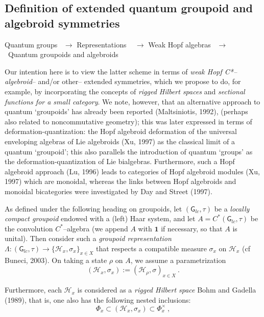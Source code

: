 \documentclass[12pt]{article}
\theoremstyle{plain}
\theoremstyle{definition}
\numberwithin{equation}{section}
\newcommand{\grp}{{\mathsf{G}}}
\newcommand{\lra}{{\longrightarrow}}
\newcommand{\<}{{\langle}}
\begin{document}
\subsection{Definition of extended quantum groupoid and algebroid symmetries}

 Quantum groups~ $\rightarrow$ Representations ~ $\rightarrow$ Weak Hopf algebras ~$\rightarrow$ ~Quantum groupoids and algebroids

   Our intention here is to view the latter scheme in terms of
\emph{weak Hopf C*--algebroid}-- and/or other-- extended
symmetries, which we propose to do, for example, by incorporating
the concepts of \emph{rigged Hilbert spaces} and \emph{sectional
functions for a small category}. We note, however, that an
alternative approach to quantum `groupoids' has already been
reported (Maltsiniotis, 1992), (perhaps also related to
noncommutative geometry); this was later expressed in terms of
deformation-quantization:  the Hopf algebroid deformation of the
universal enveloping algebras of Lie algebroids (Xu, 1997) as the
classical limit of a quantum `groupoid'; this also parallels the
introduction of quantum `groups' as the deformation-quantization
of Lie bialgebras. Furthermore, such a Hopf algebroid approach
(Lu, 1996) leads to categories of Hopf algebroid modules (Xu,
1997) which are monoidal, whereas the links between Hopf
algebroids and monoidal bicategories were investigated by Day and
Street (1997).

As defined under the following heading on groupoids, let 
$(\grp_{lc},\tau)$ be a \emph{locally compact groupoid} endowed with a (left) Haar system,
and let $A= C^*(\grp_{lc},\tau)$ be the convolution
$C^*$--algebra (we append $A$ with $\mathbf 1$ if necessary, so
that $A$ is unital). Then consider such a \textit{groupoid
representation} \\ $\Lambda :(\grp_{lc}, \tau) \lra \{\mathcal
H_x, \sigma_x \}_{x \in X}$  that respects a compatible measure
$\sigma_x$ on $\mathcal H_x$ (cf Buneci, 2003). On taking a state
$\rho$ on $A$, we assume a parametrization
\begin{equation} (\mathcal H_x, \sigma_x) := (\mathcal H_{\rho},
\sigma)_{x \in X}~.
\end{equation}

  Furthermore, each $\mathcal H_x$ is considered as a \emph{rigged Hilbert
space} Bohm and Gadella (1989), that is, one also has the following nested inclusions:
\begin{equation}
\Phi_x \subset (\mathcal H_x, \sigma_x) \subset
\Phi^{\times}_x~,
\end{equation}
\end{document}
